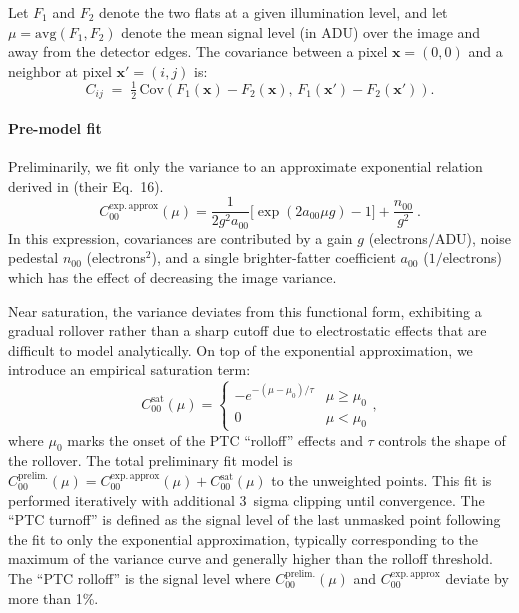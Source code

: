 Let $F_1$ and $F_2$ denote the two flats at a given illumination level, and let $\mu = \mathrm{avg}(F_1,F_2)$ denote the mean signal level (in ADU) over the image and away from the detector edges.
The covariance between a pixel $\mathbf{x}=(0,0)$ and a neighbor at pixel $\mathbf{x}'=(i,j)$ is:
\begin{equation}
    C_{ij} \;=\; \tfrac{1}{2}\,
    \mathrm{Cov}\!\left(F_1(\mathbf{x})-F_2(\mathbf{x}),\,
                       F_1(\mathbf{x}')-F_2(\mathbf{x}')\right).
\end{equation}


\paragraph{Pre-model fit}
Preliminarily, we fit only the variance to an approximate exponential relation derived in \citet{astier-2019} (their Eq.~16).
\begin{equation}
    C_{00}^{\mathrm{exp.\,approx}}(\mu) = \frac{1}{2 g^2 a_{00}}\bigl[\exp(2 a_{00} \mu g) - 1\bigr] + \frac{n_{00}}{g^2}\ .
\end{equation}
In this expression, covariances are contributed by a gain $g$ (electrons$/\mathrm{ADU}$), noise pedestal $n_{00}$ (electrons$^2$), and a single brighter-fatter coefficient $a_{00}$ ($1/$electrons) which has the effect of decreasing the image variance.

Near saturation, the variance deviates from this functional form, exhibiting a gradual rollover rather than a sharp cutoff due to electrostatic effects that are difficult to model analytically.
On top of the exponential approximation, we introduce an empirical saturation term:
\begin{equation}
    C_{00}^{\mathrm{sat}}(\mu) = \left\{
        \begin{array}{ll}
            -e^{-(\mu-\mu_0)/\tau} & \mu \ge \mu_0 \\
            0 & \mu < \mu_0
        \end{array}
    \right.,
\end{equation}
where $\mu_0$ marks the onset of the PTC ``rolloff'' effects and $\tau$ controls the shape of the rollover.
The total preliminary fit model is $C_{00}^{\mathrm{prelim.}}(\mu) = C_{00}^{\mathrm{exp.\,approx}}(\mu) + C_{00}^{\mathrm{sat}}(\mu)$ to the unweighted points. This fit is performed iteratively with additional 3~sigma clipping until convergence.
The ``PTC turnoff'' is defined as the signal level of the last unmasked point following the fit to only the exponential approximation, typically corresponding to the maximum of the variance curve and generally higher than the rolloff threshold.
The ``PTC rolloff'' is the signal level where $C_{00}^{\mathrm{prelim.}}(\mu)$ and $C_{00}^{\mathrm{exp.\,approx}}$ deviate by more than 1\%.

